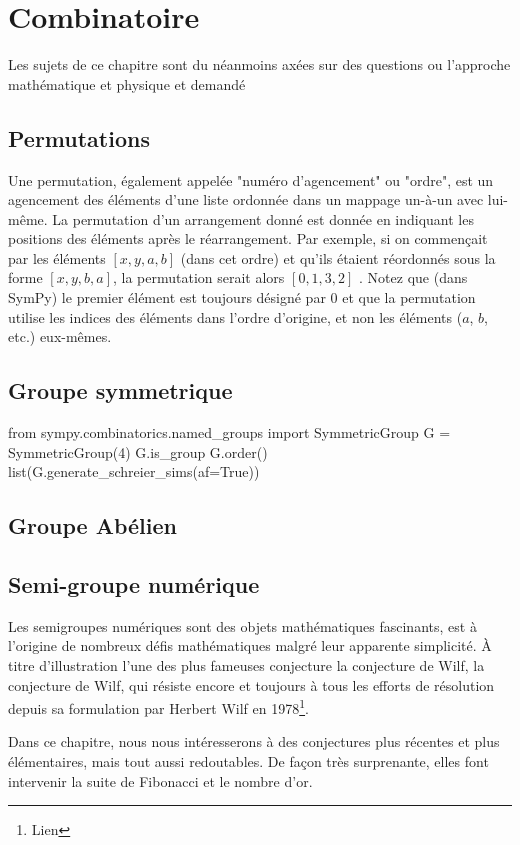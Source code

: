 \part{Combinatoire}

Les sujets de ce chapitre sont du néanmoins axées sur des questions ou l'approche mathématique et 
physique et demandé 

\chapter{Permutations}
Une permutation, également appelée "numéro d'agencement" ou "ordre", est un agencement des éléments d'une liste ordonnée dans un mappage un-à-un avec lui-même. La permutation d'un arrangement donné est donnée en indiquant les positions des éléments après le réarrangement. Par exemple, si on commençait par les éléments $\left[x, y, a, b\right]$ (dans cet ordre) et qu'ils étaient réordonnés sous la forme $\left[x, y, b, a\right]$, la permutation serait alors $\left[0, 1, 3, 2\right]$ . Notez que (dans SymPy) le premier élément est toujours désigné par $0$ et que la permutation utilise les indices des éléments dans l'ordre d'origine, et non les éléments ($a$, $b$, etc.) eux-mêmes.
\chapter{Groupe symmetrique}

 \begin{python}
  from sympy.combinatorics.named_groups import SymmetricGroup
  G = SymmetricGroup(4)
  G.is_group
  G.order()
  list(G.generate_schreier_sims(af=True))
 \end{python}
\chapter{Groupe Abélien}
\chapter{Semi-groupe numérique}
Les semigroupes numériques sont des objets mathématiques fascinants, est à l’origine de nombreux défis mathématiques malgré leur apparente simplicité. À titre d’illustration l’une des plus fameuses conjecture la conjecture de Wilf, la conjecture de Wilf, qui résiste encore et toujours à tous les efforts de résolution depuis sa formulation par Herbert Wilf en 1978\footnote{Lien}.

Dans ce chapitre, nous nous intéresserons à des conjectures plus récentes et plus élémentaires, mais tout aussi redoutables. De façon très surprenante, elles font intervenir la suite de Fibonacci et le nombre d’or.

